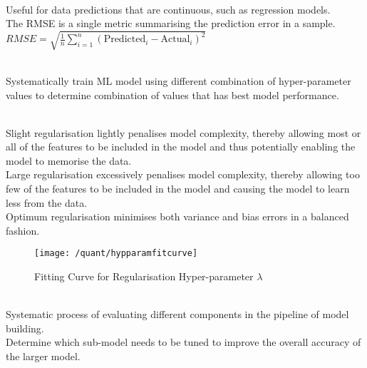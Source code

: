 \begin{definition} \\
Useful for data predictions that are continuous, such as regression models.\\
The RMSE is a single metric summarising the prediction error in a sample.
$RMSE = \sqrt{\frac{1}{n} \sum\limits_{i=1}^n (\text{Predicted}_i - \text{Actual}_i)^2}$
\end{definition}

\begin{definition} \\
Systematically train ML model using different combination of hyper-parameter values to determine combination of values that has best model performance.
\end{definition}

\begin{definition} \\
Slight regularisation lightly penalises model complexity, thereby allowing most or all of the features to be included in the model and thus potentially enabling the model to memorise the data.\\
Large regularisation excessively penalises model complexity, thereby allowing too few of the features to be included in the model and causing the model to learn less from the data.\\
Optimum regularisation minimises both variance and bias errors in a balanced fashion. 
\end{definition}

\begin{figure}[H]
\centering
\texttt{[image: /quant/hypparamfitcurve]}
\caption{Fitting Curve for Regularisation Hyper-parameter $\lambda$}
\end{figure}

\begin{definition} \\
Systematic process of evaluating different components in the pipeline of model building.\\
Determine which sub-model needs to be tuned to improve the overall accuracy of the larger model.
\end{definition}
